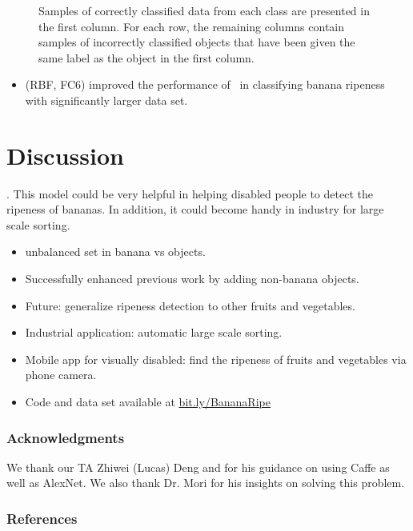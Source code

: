 \documentclass{article} %
\begin{document}
\begin{figure}[h]
\begin{subfigure}{.123\textwidth}
\captionsetup{labelformat=empty}
\caption{}
\end{subfigure}
\caption{Samples of correctly classified data from each class are presented in the first column. For each row, the remaining columns contain samples of incorrectly classified objects that have been given the same label as the object in the first column. }
\label{fig:correctVsIncorrect}
\end{figure}
\begin{itemize}
\item (RBF, FC6) improved the performance of~\citet{saad2009recognizing} in classifying banana ripeness with significantly larger data set.
\end{itemize}
\section{Discussion}
\label{sec:conclusion}
. This model could be very helpful in helping disabled people to detect the ripeness of bananas. In addition, it could become handy in industry for large scale sorting. 
\begin{itemize}
\item unbalanced set in banana vs objects. 
\item Successfully enhanced previous work by adding non-banana objects. 
\item Future: generalize ripeness detection to other fruits and vegetables. 
\item Industrial application: automatic large scale sorting. 
\item Mobile app for visually disabled: find the ripeness of fruits and vegetables via phone camera. 
\item Code and data set available at \href{bit.ly/BananaRipe}{bit.ly/BananaRipe}
\end{itemize}

\subsubsection*{Acknowledgments}
We thank our TA Zhiwei (Lucas) Deng and for his guidance on using Caffe as well as AlexNet. We also thank Dr. Mori for his insights on solving this problem. 
 
\renewcommand\refname{\vskip -.75cm}
\subsubsection*{References}

   		    
   
\end{document}
